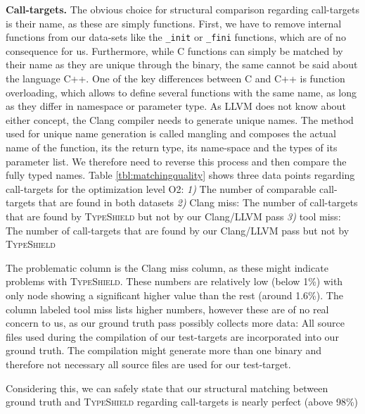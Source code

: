 \textbf{Call-targets.} The obvious choice for structural comparison regarding call-targets is their name, as these are simply functions. 
First, we have to remove internal functions from our data-sets like the \texttt{\_init} or \texttt{\_fini} functions, which are of no consequence for us. 
Furthermore, while C functions can simply be matched by their name as they are unique through the binary, the same cannot be said about the 
language C++. One of the key differences between C and C++ is function overloading, which allows to define several functions with the same name, as 
long as they differ in namespace or parameter type. As LLVM does not know about either concept, the Clang compiler needs to generate unique names. 
The method used for unique name generation is called mangling and composes the actual name of the function, its the return type, its name-space and the 
types of its parameter list. We therefore need to reverse this process and then compare the fully typed names.
Table \ref{tbl:matchingquality} shows three data points regarding call-targets for the optimization level O2:
\textit{1)}  The number of comparable call-targets that are found in both datasets
\textit{2)}  Clang miss: The number of call-targets that are found by \textsc{TypeShield} but not by our Clang/LLVM pass
\textit{3)}  tool miss: The number of call-targets that are found by our Clang/LLVM pass but not by \textsc{TypeShield}

The problematic column is the Clang miss column, as these might indicate problems with \textsc{TypeShield}. These numbers are relatively low (below 1\%) with only node showing a significant higher value than the rest (around 1.6\%). The column labeled tool miss lists 
higher numbers, however these are of no real concern to us, as our ground truth pass possibly collects more data: All source files used during the 
compilation of our test-targets are incorporated into our ground truth. The compilation might generate more than one binary and therefore not 
necessary all source files are used for our test-target.

Considering this, we can safely state that our structural matching between ground truth and \textsc{TypeShield} regarding call-targets is nearly
perfect (above 98\%)\\


